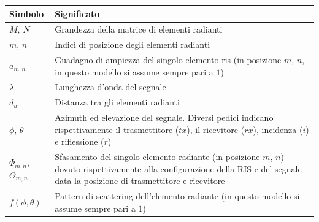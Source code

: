 \vspace{1em}

\begin{table}[!ht]
  \centering
  \begin{tabular}{p{}p{}}
    \hline
    \textbf{Simbolo}                     & \textbf{Significato}                                                                                                                                                                \\
    \hline
    $M$, $N$                             & Grandezza della matrice di elementi radianti                                                                                                                                        \\
    $m$, $n$                             & Indici di posizione degli elementi radianti                                                                                                                                         \\
    $a_{m,n}$                            & Guadagno di ampiezza del singolo elemento ris (in posizione $m$, $n$, in questo modello si assume sempre pari a $1$)                                                                \\
    $\lambda$                            & Lunghezza d'onda del segnale                                                                                                                                                        \\
    $d_{u}$                              & Distanza tra gli elementi radianti                                                                                                                                                  \\
    $\phi$, $\theta$                     & Azimuth ed elevazione del segnale. Diversi pedici indicano rispettivamente il trasmettitore ($tx$), il ricevitore ($rx$), incidenza ($i$) e riflessione ($r$)                       \\
    $\Phi_{m,n}$, $\Theta_{m,n}$         & Sfasamento del singolo elemento radiante (in posizione $m$, $n$) dovuto rispettivamente alla configurazione della RIS e del segnale data la posizione di trasmettitore e ricevitore \\
    $f(\phi, \theta)$                    & Pattern di scattering dell'elemento radiante (in questo modello si assume sempre pari a $1$)                                                                                        \\

\end{tabular}
\end{table}
